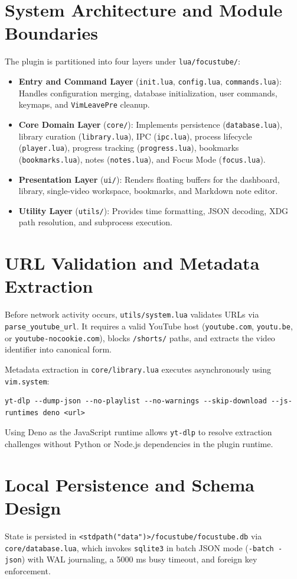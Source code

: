 \documentclass[11pt,a4paper]{article}
\begin{document}
\section{System Architecture and Module Boundaries}
The plugin is partitioned into four layers under \texttt{lua/focustube/}:
\begin{itemize}
  \item \textbf{Entry and Command Layer} (\texttt{init.lua}, \texttt{config.lua}, \texttt{commands.lua}): Handles configuration merging, database initialization, user commands, keymaps, and \texttt{VimLeavePre} cleanup.
  \item \textbf{Core Domain Layer} (\texttt{core/}): Implements persistence (\texttt{database.lua}), library curation (\texttt{library.lua}), IPC (\texttt{ipc.lua}), process lifecycle (\texttt{player.lua}), progress tracking (\texttt{progress.lua}), bookmarks (\texttt{bookmarks.lua}), notes (\texttt{notes.lua}), and Focus Mode (\texttt{focus.lua}).
  \item \textbf{Presentation Layer} (\texttt{ui/}): Renders floating buffers for the dashboard, library, single-video workspace, bookmarks, and Markdown note editor.
  \item \textbf{Utility Layer} (\texttt{utils/}): Provides time formatting, JSON decoding, XDG path resolution, and subprocess execution.
\end{itemize}

\section{URL Validation and Metadata Extraction}
Before network activity occurs, \texttt{utils/system.lua} validates URLs via \texttt{parse\_youtube\_url}. It requires a valid YouTube host (\texttt{youtube.com}, \texttt{youtu.be}, or \texttt{youtube-nocookie.com}), blocks \texttt{/shorts/} paths, and extracts the video identifier into canonical form.

Metadata extraction in \texttt{core/library.lua} executes asynchronously using \texttt{vim.system}:
\begin{verbatim}
yt-dlp --dump-json --no-playlist --no-warnings --skip-download --js-runtimes deno <url>
\end{verbatim}
Using Deno as the JavaScript runtime allows \texttt{yt-dlp} to resolve extraction challenges without Python or Node.js dependencies in the plugin runtime.

\section{Local Persistence and Schema Design}
State is persisted in \texttt{<stdpath("data")>/focustube/focustube.db} via \texttt{core/database.lua}, which invokes \texttt{sqlite3} in batch JSON mode (\texttt{-batch -json}) with WAL journaling, a 5000 ms busy timeout, and foreign key enforcement.
\end{document}
